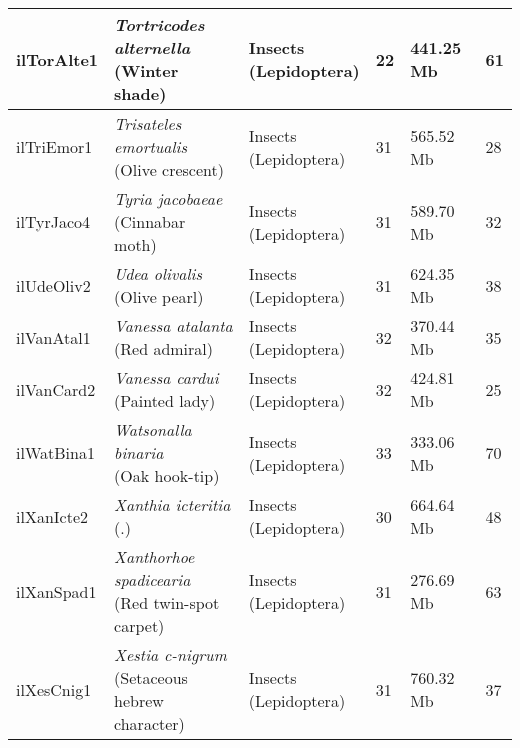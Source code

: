 \begin{centering}
\begin{longtable}{l|l|l|l|l|l}
ilTorAlte1 & \makecell[{l}]{\textit{Tortricodes alternella} \\ (Winter shade)} & \makecell[{l}]{Insects \\ (Lepidoptera)} & 22 & 441.25 Mb & 61  \\ \hline
ilTriEmor1 & \makecell[{l}]{\textit{Trisateles emortualis} \\ (Olive crescent)} & \makecell[{l}]{Insects \\ (Lepidoptera)} & 31 & 565.52 Mb & 28  \\ \hline
ilTyrJaco4 & \makecell[{l}]{\textit{Tyria jacobaeae} \\ (Cinnabar moth)} & \makecell[{l}]{Insects \\ (Lepidoptera)} & 31 & 589.70 Mb & 32  \\ \hline
ilUdeOliv2 & \makecell[{l}]{\textit{Udea olivalis} \\ (Olive pearl)} & \makecell[{l}]{Insects \\ (Lepidoptera)} & 31 & 624.35 Mb & 38  \\ \hline
ilVanAtal1 & \makecell[{l}]{\textit{Vanessa atalanta} \\ (Red admiral)} & \makecell[{l}]{Insects \\ (Lepidoptera)} & 32 & 370.44 Mb & 35  \\ \hline
ilVanCard2 & \makecell[{l}]{\textit{Vanessa cardui} \\ (Painted lady)} & \makecell[{l}]{Insects \\ (Lepidoptera)} & 32 & 424.81 Mb & 25  \\ \hline
ilWatBina1 & \makecell[{l}]{\textit{Watsonalla binaria} \\ (Oak hook-tip)} & \makecell[{l}]{Insects \\ (Lepidoptera)} & 33 & 333.06 Mb & 70  \\ \hline
ilXanIcte2 & \makecell[{l}]{\textit{Xanthia icteritia} \\ (.)} & \makecell[{l}]{Insects \\ (Lepidoptera)} & 30 & 664.64 Mb & 48  \\ \hline
ilXanSpad1 & \makecell[{l}]{\textit{Xanthorhoe spadicearia} \\ (Red twin-spot carpet)} & \makecell[{l}]{Insects \\ (Lepidoptera)} & 31 & 276.69 Mb & 63  \\ \hline
ilXesCnig1 & \makecell[{l}]{\textit{Xestia c-nigrum} \\ (Setaceous hebrew character)} & \makecell[{l}]{Insects \\ (Lepidoptera)} & 31 & 760.32 Mb & 37  \\ \hline

\end{longtable}
\end{centering}
